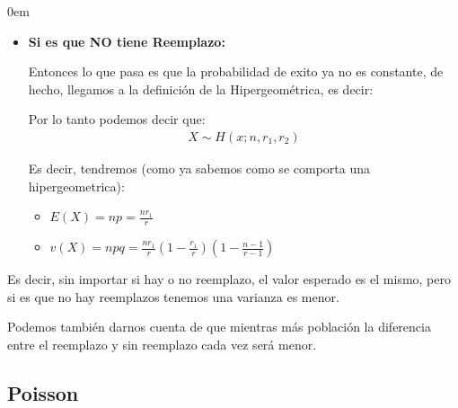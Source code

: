 \documentclass[12pt, fleqn]{report}                             %
\newenvironment{SmallIndentation}[1][0.75em]                    %
        {\begin{adjustwidth}{#1}{}\begin{footnotesize}}             %
        {\end{footnotesize}\end{adjustwidth}}                       %
\theoremstyle{break}                                            %
\newcommand{\Wrap}[1]           {\left( #1 \right)}             %
\begin{document}
\begin{multicols*}{2}
\begin{SmallIndentation}[0em]
\begin{itemize}
                            \item 
                                \textbf{Si es que NO tiene Reemplazo:}

                                Entonces lo que pasa es que la probabilidad de exito ya no es constante,
                                de hecho, llegamos a la definición de la Hipergeométrica, es decir:

                                Por lo tanto podemos decir que:
                                \begin{align*}
                                    X \sim H(x; n, r_1, r_2)
                                \end{align*}

                                Es decir, tendremos (como ya sabemos como se comporta una hipergeometrica):
                                \begin{itemize}
                                    \item $E(X) = np = \frac{nr_1}{r}$
                                    \item $v(X) = npq = \frac{nr_1}{r}\Wrap{1 - \frac{r_1}{r}}\Wrap{1 - \frac{n-1}{r-1}}$
                                \end{itemize}

                        \end{itemize}

                        Es decir, sin importar si hay o no reemplazo, el valor esperado es el mismo, pero
                        si es que no hay reemplazos tenemos una varianza es menor.

                        Podemos también darnos cuenta de que mientras más población la diferencia entre
                        el reemplazo y sin reemplazo cada vez será menor.


                \end{SmallIndentation}
                \end{multicols*}



            \clearpage
            \subsection{Poisson}
\end{document}
